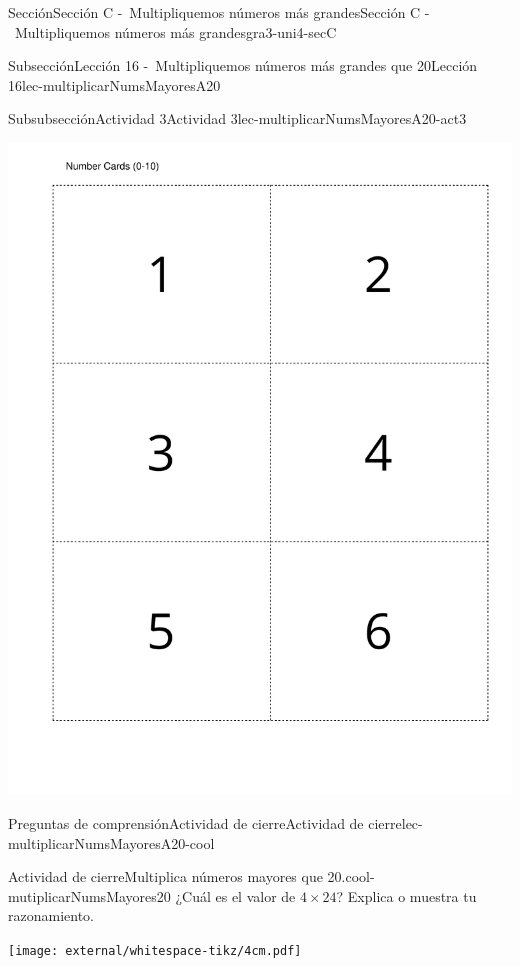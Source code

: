 \begin{sectionptx}{Sección}{Sección C -~Multipliquemos números más grandes}{}{Sección C -~Multipliquemos números más grandes}{}{}{gra3-uni4-secC}
\begin{subsectionptx}{Subsección}{Lección 16 -~Multipliquemos números más grandes que 20}{}{Lección 16}{}{}{lec-multiplicarNumsMayoresA20}
\begin{subsubsectionptx}{Subsubsección}{Actividad 3}{}{Actividad 3}{}{}{lec-multiplicarNumsMayoresA20-act3}
\begin{cutoutpage}
\begin{image}{0}{1}{0}{}
\includegraphics[page=4, rotate=90, scale=0.55, trim=40 40 20 40, clip, center] {external/blm/pdf-source/tarjetasDeDigitos.pdf}
\end{image}
\end{cutoutpage}
\end{subsubsectionptx}
%
%
\typeout{************************************************}
\typeout{************************************************}
%
\begin{reading-questions-subsubsection}{Preguntas de comprensión}{Actividad de cierre}{}{Actividad de cierre}{}{}{lec-multiplicarNumsMayoresA20-cool}
\begin{project}{Actividad de cierre}{Multiplica números mayores que 20.}{cool-mutiplicarNumsMayores20}%
¿Cuál es el valor de \(4\times 24\)? Explica o muestra tu razonamiento.%
\begin{image}{0}{1}{0}{}%
\texttt{[image: external/whitespace-tikz/4cm.pdf]}
\end{image}%

\end{project}
\end{reading-questions-subsubsection}
\end{subsectionptx}
\end{sectionptx}
